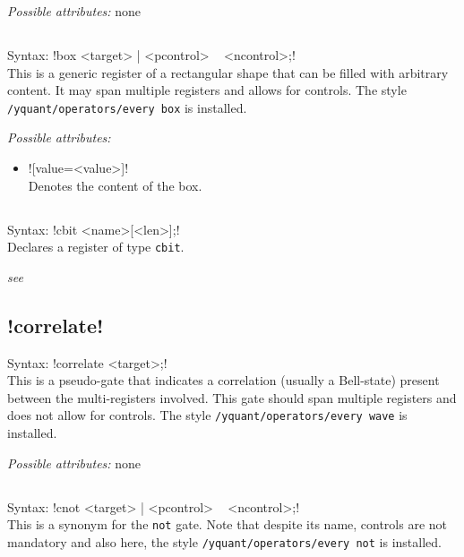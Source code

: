 \documentclass{scrartcl}
\def\ttlink{\link\texttt}
\def\yquantlink{\link\yquant}
\begin{document}
         \emph{Possible attributes:} none

      \subsection{\texorpdfstring{}{box}}
         Syntax: \yquant!box <target> | <pcontrol> ~ <ncontrol>;! \\
         This is a generic register of a rectangular shape that can be filled with arbitrary content.
         It may span multiple registers and allows for controls.
         The style \ttlink{/yquant/operators/every box} is installed.

         \emph{Possible attributes:}
         \begin{itemize}
            \item \yquant![value=<value>]! \\
               Denotes the content of the box.
         \end{itemize}

      \subsection{\texorpdfstring{}{cbit}}
         Syntax: \yquant!cbit <name>[<len>];! \\
         Declares a register of type \texttt{cbit}.

         \emph{see \yquantlink{qubit}}

      \subsection[\texorpdfstring{\yquant{correlate}}{correlate}]{\yquant!correlate!}
         Syntax: \yquant!correlate <target>;! \\
         This is a pseudo\hyp gate that indicates a correlation (usually a Bell\hyp state) present between the multi\hyp registers involved.
         This gate should span multiple registers and does not allow for controls.
         The style \ttlink{/yquant/operators/every wave} is installed.

         \emph{Possible attributes:} none

      \subsection{\texorpdfstring{}{cnot}}
         Syntax: \yquant!cnot <target> | <pcontrol> ~ <ncontrol>;! \\
         This is a synonym for the \ttlink{not} gate.
         Note that despite its name, controls are not mandatory and also here, the style \ttlink{/yquant/operators/every not} is installed.
\end{document}
